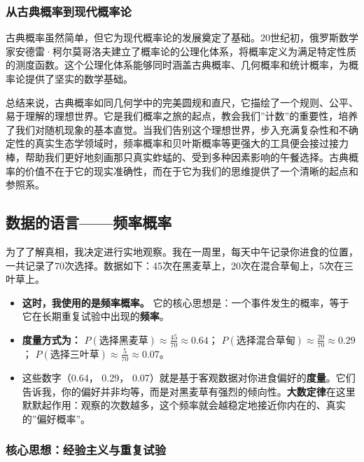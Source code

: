 \documentclass[
]{book}
\providecommand{\tightlist}{%
  \setlength{\itemsep}{0pt}\setlength{\parskip}{0pt}}
\begin{document}
\hypertarget{ux4eceux53e4ux5178ux6982ux7387ux5230ux73b0ux4ee3ux6982ux7387ux8bba}{%
\subsubsection{从古典概率到现代概率论}\label{ux4eceux53e4ux5178ux6982ux7387ux5230ux73b0ux4ee3ux6982ux7387ux8bba}}

古典概率虽然简单，但它为现代概率论的发展奠定了基础。20世纪初，俄罗斯数学家安德雷·柯尔莫哥洛夫建立了概率论的公理化体系，将概率定义为满足特定性质的测度函数。这个公理化体系能够同时涵盖古典概率、几何概率和统计概率，为概率论提供了坚实的数学基础。

总结来说，古典概率如同几何学中的完美圆规和直尺，它描绘了一个规则、公平、易于理解的理想世界。它是我们概率之旅的起点，教会我们''计数''的重要性，培养了我们对随机现象的基本直觉。当我们告别这个理想世界，步入充满复杂性和不确定性的真实生态学领域时，频率概率和贝叶斯概率等更强大的工具便会接过接力棒，帮助我们更好地刻画那只真实蚱蜢的、受到多种因素影响的午餐选择。古典概率的价值不在于它的现实准确性，而在于它为我们的思维提供了一个清晰的起点和参照系。

\hypertarget{ux6570ux636eux7684ux8bedux8a00ux9891ux7387ux6982ux7387}{%
\subsection{数据的语言------频率概率}\label{ux6570ux636eux7684ux8bedux8a00ux9891ux7387ux6982ux7387}}

为了了解真相，我决定进行实地观察。我在一周里，每天中午记录你进食的位置，一共记录了70次选择。数据如下：45次在黑麦草上，20次在混合草甸上，5次在三叶草上。

\begin{itemize}
\tightlist
\item
  \textbf{这时，我使用的是频率概率。} 它的核心思想是：一个事件发生的概率，等于它在长期重复试验中出现的\textbf{频率}。
\item
  \textbf{度量方式为：} \(P(\text{选择黑麦草}) \approx \frac{45}{70} \approx 0.64\)； \(P(\text{选择混合草甸}) \approx \frac{20}{70} \approx 0.29\)； \(P(\text{选择三叶草}) \approx \frac{5}{70} \approx 0.07\)。
\item
  这些数字（0.64， 0.29， 0.07）就是基于客观数据对你进食偏好的\textbf{度量}。它们告诉我，你的偏好并非均等，而是对黑麦草有强烈的倾向性。\textbf{大数定律}在这里默默起作用：观察的次数越多，这个频率就会越稳定地接近你内在的、真实的''偏好概率''。
\end{itemize}

\hypertarget{ux6838ux5fc3ux601dux60f3ux7ecfux9a8cux4e3bux4e49ux4e0eux91cdux590dux8bd5ux9a8c}{%
\subsubsection{核心思想：经验主义与重复试验}\label{ux6838ux5fc3ux601dux60f3ux7ecfux9a8cux4e3bux4e49ux4e0eux91cdux590dux8bd5ux9a8c}}
\end{document}
